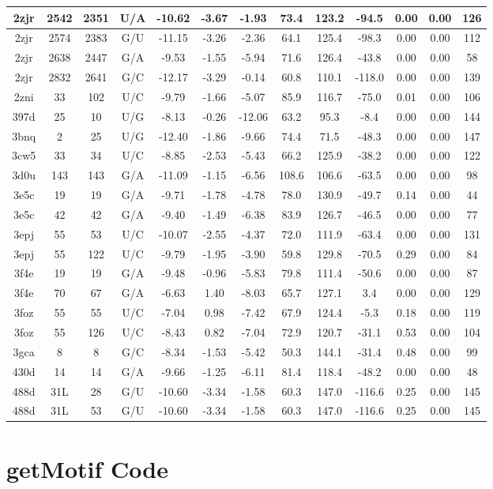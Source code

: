{\begin{center}
\begin{longtable}{|c|c|c|c|c|c|c|c|c|c|c|c|c|}
2zjr & 2542 & 2351 & U/A & -10.62 & -3.67 & -1.93 & 73.4 & 123.2 & -94.5 & 0.00 & 0.00 & 126 \\ \hline
2zjr & 2574 & 2383 & G/U & -11.15 & -3.26 & -2.36 & 64.1 & 125.4 & -98.3 & 0.00 & 0.00 & 112 \\ \hline
2zjr & 2638 & 2447 & G/A & -9.53 & -1.55 & -5.94 & 71.6 & 126.4 & -43.8 & 0.00 & 0.00 & 58 \\ \hline
2zjr & 2832 & 2641 & G/C & -12.17 & -3.29 & -0.14 & 60.8 & 110.1 & -118.0 & 0.00 & 0.00 & 139 \\ \hline
2zni & 33 & 102 & U/C & -9.79 & -1.66 & -5.07 & 85.9 & 116.7 & -75.0 & 0.01 & 0.00 & 106 \\ \hline
397d & 25 & 10 & U/G & -8.13 & -0.26 & -12.06 & 63.2 & 95.3 & -8.4 & 0.00 & 0.00 & 144 \\ \hline
3bnq & 2 & 25 & U/G & -12.40 & -1.86 & -9.66 & 74.4 & 71.5 & -48.3 & 0.00 & 0.00 & 147 \\ \hline
3cw5 & 33 & 34 & U/C & -8.85 & -2.53 & -5.43 & 66.2 & 125.9 & -38.2 & 0.00 & 0.00 & 122 \\ \hline
3d0u & 143 & 143 & G/A & -11.09 & -1.15 & -6.56 & 108.6 & 106.6 & -63.5 & 0.00 & 0.00 & 98 \\ \hline
3e5c & 19 & 19 & G/A & -9.71 & -1.78 & -4.78 & 78.0 & 130.9 & -49.7 & 0.14 & 0.00 & 44 \\ \hline
3e5c & 42 & 42 & G/A & -9.40 & -1.49 & -6.38 & 83.9 & 126.7 & -46.5 & 0.00 & 0.00 & 77 \\ \hline
3epj & 55 & 53 & U/C & -10.07 & -2.55 & -4.37 & 72.0 & 111.9 & -63.4 & 0.00 & 0.00 & 131 \\ \hline
3epj & 55 & 122 & U/C & -9.79 & -1.95 & -3.90 & 59.8 & 129.8 & -70.5 & 0.29 & 0.00 & 84 \\ \hline
3f4e & 19 & 19 & G/A & -9.48 & -0.96 & -5.83 & 79.8 & 111.4 & -50.6 & 0.00 & 0.00 & 87 \\ \hline
3f4e & 70 & 67 & G/A & -6.63 & 1.40 & -8.03 & 65.7 & 127.1 & 3.4 & 0.00 & 0.00 & 129 \\ \hline
3foz & 55 & 55 & U/C & -7.04 & 0.98 & -7.42 & 67.9 & 124.4 & -5.3 & 0.18 & 0.00 & 119 \\ \hline
3foz & 55 & 126 & U/C & -8.43 & 0.82 & -7.04 & 72.9 & 120.7 & -31.1 & 0.53 & 0.00 & 104 \\ \hline
3gca & 8 & 8 & G/C & -8.34 & -1.53 & -5.42 & 50.3 & 144.1 & -31.4 & 0.48 & 0.00 & 99 \\ \hline
430d & 14 & 14 & G/A & -9.66 & -1.25 & -6.11 & 81.4 & 118.4 & -48.2 & 0.00 & 0.00 & 48 \\ \hline
488d & 31L & 28 & G/U & -10.60 & -3.34 & -1.58 & 60.3 & 147.0 & -116.6 & 0.25 & 0.00 & 145 \\ \hline
488d & 31L & 53 & G/U & -10.60 & -3.34 & -1.58 & 60.3 & 147.0 & -116.6 & 0.25 & 0.00 & 145 \\ \hline
\end{longtable}
\end{center}
}

\chapter{getMotif Code}



%
